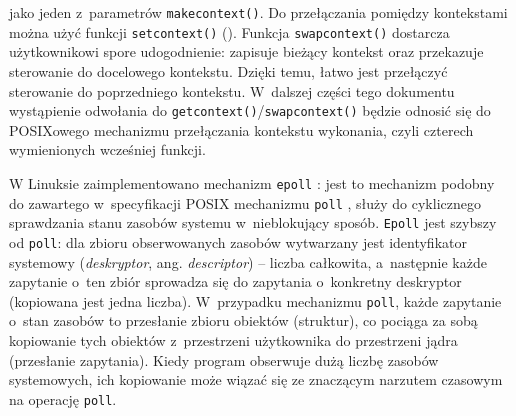 \documentclass[12pt]{mwart}
\newcommand{\code}{\texttt}
\newcommand{\procbr}{()}
\newcommand{\function}[1]{\code{#1\procbr}}
\begin{document}
  jako jeden z~parametrów \function{makecontext}.
  Do przełączania pomiędzy kontekstami można użyć funkcji \function{setcontext} (\cite{setcontext}). Funkcja \function{swapcontext} \cite{swapcontext} dostarcza użytkownikowi spore udogodnienie: zapisuje bieżący kontekst oraz przekazuje sterowanie
  do docelowego kontekstu. Dzięki temu, łatwo jest przełączyć sterowanie do poprzedniego kontekstu.
  W~dalszej części tego dokumentu wystąpienie odwołania do \function{getcontext}/\function{swapcontext} będzie odnosić się do POSIX\dywiz owego mechanizmu przełączania kontekstu wykonania, czyli 
  czterech wymienionych wcześniej funkcji.
\par
%
\indent
  W Linuksie zaimplementowano mechanizm \code{epoll} \cite{epoll}: jest to mechanizm podobny do
  zawartego w~specyfikacji POSIX mechanizmu \code{poll} \cite{poll}, służy do cyklicznego sprawdzania stanu zasobów systemu w~nieblokujący sposób.
  \code{Epoll} jest szybszy od \code{poll}: dla zbioru obserwowanych zasobów wytwarzany jest identyfikator systemowy 
  (\emph{deskryptor}, ang. \emph{descriptor}) -- liczba całkowita, a~następnie każde zapytanie o~ten zbiór sprowadza się do zapytania
  o~konkretny deskryptor (kopiowana jest jedna liczba). W~przypadku mechanizmu \code{poll}, każde zapytanie o~stan zasobów to przesłanie zbioru obiektów (struktur),
  co pociąga za sobą kopiowanie tych obiektów z~przestrzeni użytkownika do przestrzeni jądra (przesłanie zapytania). Kiedy program obserwuje dużą liczbę
  zasobów systemowych, ich kopiowanie może wiązać się ze znaczącym narzutem czasowym na operację \code{poll}.
\par
\end{document}
